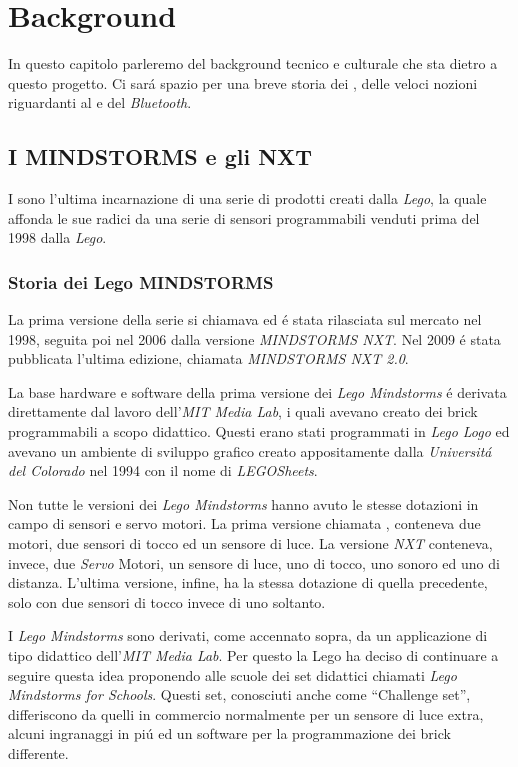 \chapter{Background}

In questo capitolo parleremo del background tecnico e culturale che sta
dietro a questo progetto. Ci sar\'a spazio per una breve storia dei \nxt{}, 
delle veloci nozioni riguardanti al \PID{} e del \emph{Bluetooth}.

\section{I MINDSTORMS e gli NXT}
I \nxt{} sono l'ultima incarnazione di una serie di prodotti creati
dalla \emph{Lego}, la quale affonda le sue radici da una serie di sensori
programmabili venduti prima del 1998 dalla \emph{Lego}.

\subsection{Storia dei Lego MINDSTORMS}
La prima versione
della serie si chiamava \RIS{} ed \'e stata rilasciata sul mercato nel
1998, seguita poi nel 2006 dalla versione \emph{MINDSTORMS NXT}. Nel 2009
\'e stata pubblicata l'ultima edizione, chiamata \emph{MINDSTORMS NXT 2.0}.

La base hardware e software della prima versione dei \emph{Lego Mindstorms}
\'e derivata direttamente dal lavoro dell'\emph{MIT Media Lab}, i quali
avevano creato dei brick programmabili a scopo didattico. Questi erano stati 
programmati in \emph{Lego Logo} ed avevano un ambiente di sviluppo grafico
creato appositamente dalla \emph{Universit\'a del Colorado} nel 1994 con il
nome di \emph{LEGOSheets}.

Non tutte le versioni dei \emph{Lego Mindstorms} hanno avuto le stesse
dotazioni in campo di sensori e servo motori. La prima versione chiamata
\RIS{}, conteneva due motori, due sensori di tocco ed un
sensore di luce. La versione \emph{NXT} conteneva, invece, due \emph{Servo}
Motori, un sensore di luce, uno di tocco, uno sonoro ed uno di distanza.
L'ultima versione, infine, ha la stessa dotazione di quella precedente,
solo con due sensori di tocco invece di uno soltanto. 

I \emph{Lego Mindstorms} sono derivati, come accennato sopra, da un applicazione 
di tipo didattico dell'\emph{MIT Media Lab}. Per questo la Lego ha deciso
di continuare a seguire questa idea proponendo alle scuole dei set
didattici chiamati \emph{Lego Mindstorms for Schools}. Questi set,
conosciuti anche come ``Challenge set'', differiscono da quelli in
commercio normalmente per un sensore di luce extra, alcuni ingranaggi in
pi\'u ed un software per la programmazione dei brick differente.

